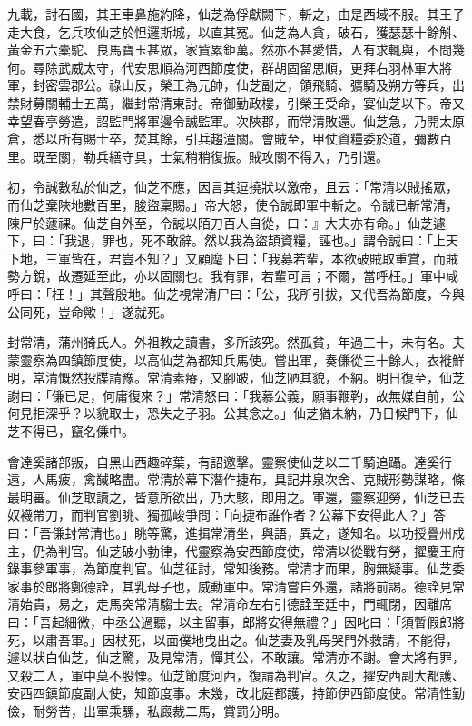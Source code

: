 \begin{pinyinscope}
 九載，討石國，其王車鼻施約降，仙芝為俘獻闕下，斬之，由是西域不服。其王子走大食，乞兵攻仙芝於怛邏斯城，以直其冤。仙芝為人貪，破石，獲瑟瑟十餘斛、黃金五六橐駝、良馬寶玉甚眾，家貲累鉅萬。然亦不甚愛惜，人有求輒與，不問幾何。尋除武威太守，代安思順為河西節度使，群胡固留思順，更拜右羽林軍大將軍，封密雲郡公。祿山反，榮王為元帥，仙芝副之，領飛騎、彍騎及朔方等兵，出禁財募關輔士五萬，繼封常清東討。帝御勤政樓，引榮王受命，宴仙芝以下。帝又幸望春亭勞遣，詔監門將軍邊令誠監軍。次陜郡，而常清敗還。仙芝急，乃開太原倉，悉以所有賜士卒，焚其餘，引兵趨潼關。會賊至，甲仗資糧委於道，彌數百里。既至關，勒兵繕守具，士氣稍稍復振。賊攻關不得入，乃引還。



 初，令誠數私於仙芝，仙芝不應，因言其逗撓狀以激帝，且云：「常清以賊搖眾，而仙芝棄陜地數百里，朘盜稟賜。」帝大怒，使令誠即軍中斬之。令誠已斬常清，陳尸於蘧祼。仙芝自外至，令誠以陌刀百人自從，曰：』大夫亦有命。」仙芝遽下，曰：「我退，罪也，死不敢辭。然以我為盜頡資糧，誣也。」謂令誠曰：「上天下地，三軍皆在，君豈不知？」又顧麾下曰：「我募若輩，本欲破賊取重賞，而賊勢方銳，故遷延至此，亦以固關也。我有罪，若輩可言；不爾，當呼枉。」軍中咸呼曰：「枉！」其聲殷地。仙芝視常清尸曰：「公，我所引拔，又代吾為節度，今與公同死，豈命歟！」遂就死。



 封常清，蒲州猗氏人。外祖教之讀書，多所該究。然孤貧，年過三十，未有名。夫蒙靈察為四鎮節度使，以高仙芝為都知兵馬使。嘗出軍，奏傔從三十餘人，衣褷鮮明，常清慨然投牒請豫。常清素瘠，又腳跛，仙芝陋其貌，不納。明日復至，仙芝謝曰：「傔已足，何庸復來？」常清怒曰：「我慕公義，願事鞭靮，故無媒自前，公何見拒深乎？以貌取士，恐失之子羽。公其念之。」仙芝猶未納，乃日候門下，仙芝不得已，竄名傔中。



 會達奚諸部叛，自黑山西趣碎葉，有詔邀擊。靈察使仙芝以二千騎追躡。達奚行遠，人馬疲，禽馘略盡。常清於幕下潛作捷布，具記井泉次舍、克賊形勢謀略，條最明審。仙芝取讀之，皆意所欲出，乃大駭，即用之。軍還，靈察迎勞，仙芝已去奴襪帶刀，而判官劉眺、獨孤峻爭問：「向捷布誰作者？公幕下安得此人？」答曰：「吾傔封常清也。」眺等驚，進揖常清坐，與語，異之，遂知名。以功授疊州戍主，仍為判官。仙芝破小勃律，代靈察為安西節度使，常清以從戰有勞，擢慶王府錄事參軍事，為節度判官。仙芝征討，常知後務。常清才而果，胸無疑事。仙芝委家事於郎將鄭德詮，其乳母子也，威動軍中。常清嘗自外還，諸將前謁。德詮見常清始貴，易之，走馬突常清騶士去。常清命左右引德詮至廷中，門輒閉，因離席曰：「吾起細微，中丞公過聽，以主留事，郎將安得無禮？」因叱曰：「須暫假郎將死，以肅吾軍。」因杖死，以面僕地曳出之。仙芝妻及乳母哭門外救請，不能得，遽以狀白仙芝，仙芝驚，及見常清，憚其公，不敢讓。常清亦不謝。會大將有罪，又殺二人，軍中莫不股慄。仙芝節度河西，復請為判官。久之，擢安西副大都護、安西四鎮節度副大使，知節度事。未幾，改北庭都護，持節伊西節度使。常清性勤儉，耐勞苦，出軍乘騾，私廄裁二馬，賞罰分明。




\end{pinyinscope}
